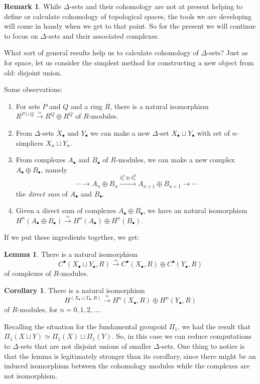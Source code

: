 \documentclass{tufte-handout}
\theoremstyle{definition}
\newtheorem{lemma}{Lemma}
\newtheorem{corollary}{Corollary}
\newtheorem*{rem}{Remark}
\begin{document}
\begin{rem}
While $\Delta$-sets and their cohomology are not at present helping to define or calculate
cohomology of topological spaces, the tools we are developing will come in handy when we get
to that point. So for the present we will continue to focus on $\Delta$-sets and their associated
complexes. 
\end{rem}

What sort of general results help us to calculate cohomology of $\Delta$-sets? Just as for space,
let us consider the simplest method for constructing a new object from old: disjoint union.

Some observations:
\begin{enumerate}
\item For sets $P$ and $Q$ and a ring $R$, there is a natural isomorphism 
$R^{P\sqcup Q} \xrightarrow{\simeq} R^Q \oplus R^Q$ of $R$-modules.

\item From $\Delta$-sets $X_\bullet$ and $Y_\bullet$ we can make a new $\Delta$-set
$X_\bullet\sqcup Y_\bullet$ with set of $n$-simplices $X_n\sqcup Y_n$.

\item From complexes $A_\bullet$ and $B_\bullet$ of $R$-modules, we can make a new complex
$A_\bullet \oplus B_\bullet$, namely
\[
	\cdots \to A_n\oplus B_n \xrightarrow{\delta^A_n\oplus \delta^B_n} A_{n+1}\oplus B_{n+1} \to \cdots
\]
the \emph{direct sum} of $A_\bullet$ and $B_\bullet$.

\item Given a direct sum of complexes $A_\bullet\oplus B_\bullet$, we have an natural isomorphism
$H^n(A_\bullet\oplus B_\bullet) \xrightarrow{\simeq} H^n(A_\bullet)\oplus H^n(B_\bullet)$.
\end{enumerate}

If we put these ingredients together, we get:
\begin{lemma}
There is a natural isomorphism 
\[
	C^\bullet(X_\bullet\sqcup Y_\bullet,R) \xrightarrow{\simeq}
C^\bullet(X_\bullet,R)\oplus C^\bullet(Y_\bullet,R)
\]
of complexes of $R$-modules.
\end{lemma}

\begin{corollary}
There is a natural isomorphism 
\[
H^(X_\bullet\sqcup Y_\bullet,R) \xrightarrow{\simeq} H^n(X_\bullet,R) \oplus H^n(Y_\bullet,R)
\]
of $R$-modules, for $n=0,1,2,\ldots$.
\end{corollary}

Recalling the situation for the fundamental groupoid $\Pi_1$, we had the result that
$\Pi_1(X\sqcup Y) \simeq \Pi_1(X)\sqcup \Pi_1(Y)$. So, in this case we can reduce computations
to $\Delta$-sets that are not disjoint unions of smaller $\Delta$-sets. One thing to notice 
is that the lemma is legitimately stronger than its corollary, since there might be an induced
isomorphism between the cohomology modules while the complexes are not isomorphism.
\end{document}
